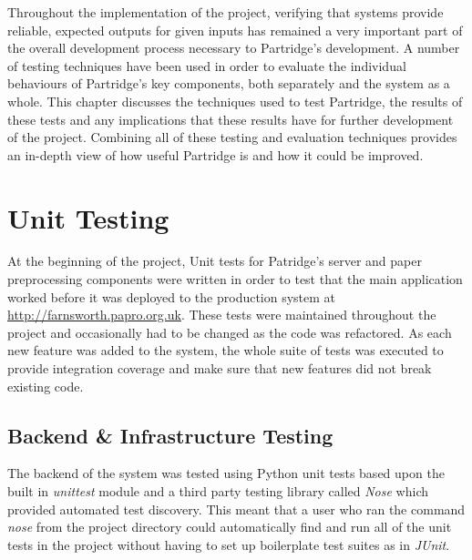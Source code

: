 %  
%

Throughout the implementation of the project, verifying that systems provide
reliable, expected outputs for given inputs has remained a very important part
of the overall development process necessary to Partridge's development.  A
number of testing techniques have been used in order to evaluate the individual
behaviours of Partridge's key components, both separately and the system as a
whole. This chapter discusses the techniques used to test Partridge, the
results of these tests and any implications that these results have for further
development of the project. Combining all of these testing and evaluation
techniques provides an in-depth view of how useful Partridge is and how it could
be improved.

\section{ Unit Testing }

At the beginning of the project, Unit tests for Patridge's server and paper
preprocessing components were written in order to test that the main application worked before it was deployed to the production system at
\url{http://farnsworth.papro.org.uk}. These tests were maintained
throughout the project and occasionally had to be changed as the code was
refactored. As each new feature was added to the system, the whole suite of
tests was executed to provide integration coverage and make sure that new
features did not break existing code. 

\subsection{ Backend \& Infrastructure Testing}

The backend of the system was tested using Python unit tests based upon the
built in \emph{unittest} module and a third party testing library called
\emph{Nose} which provided automated test discovery. This meant that a user who
ran the command \emph{nose} from the project directory could automatically find
and run all of the unit tests in the project without having to set up
boilerplate test suites as in \emph{JUnit}.

